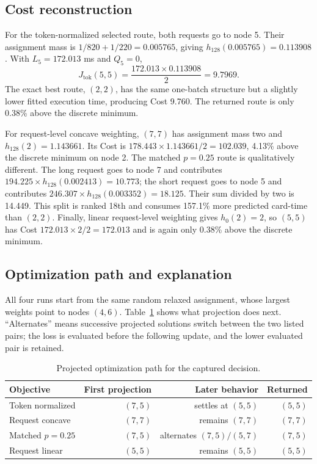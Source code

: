 \documentclass[10pt]{article}
\begin{document}
\subsection{Cost reconstruction}

For the token-normalized selected route, both requests go to node 5. Their
assignment mass is $1/820+1/220=0.005765$, giving
$h_{128}(0.005765)=0.113908$. With $L_5=172.013$ ms and $Q_5=0$,
\begin{equation}
J_{\mathrm{tok}}(5,5)
=\frac{172.013\times0.113908}{2}=9.7969.
\end{equation}
The exact best route, $(2,2)$, has the same one-batch structure but a slightly
lower fitted execution time, producing Cost 9.760. The returned route is only
0.38\% above the discrete minimum.

For request-level concave weighting, $(7,7)$ has assignment mass two and
$h_{128}(2)=1.143661$. Its Cost is
$178.443\times1.143661/2=102.039$, 4.13\% above the discrete minimum on node 2.
The matched $p=0.25$ route is qualitatively different. The long request goes
to node 7 and contributes
$194.225\times h_{128}(0.002413)=10.773$; the short request goes to node 5 and
contributes $246.307\times h_{128}(0.003352)=18.125$. Their sum divided by two
is 14.449. This split is ranked 18th and consumes 157.1\% more predicted
card-time than $(2,2)$. Finally, linear request-level weighting gives
$h_0(2)=2$, so $(5,5)$ has Cost $172.013\times2/2=172.013$ and is again only
0.38\% above the discrete minimum.

\subsection{Optimization path and explanation}

All four runs start from the same random relaxed assignment, whose largest
weights point to nodes $(4,6)$. Table~\ref{tab:decision-optimization-path}
shows what projection does next. ``Alternates'' means successive projected
solutions switch between the two listed pairs; the loss is evaluated before
the following update, and the lower evaluated pair is retained.

\begin{table}[t]
\centering
\small
\caption{Projected optimization path for the captured decision.}
\label{tab:decision-optimization-path}
\begin{tabular}{lrrr}
\toprule
Objective & First projection & Later behavior & Returned \\
\midrule
Token normalized & $(7,5)$ & settles at $(5,5)$ & $(5,5)$ \\
Request concave & $(7,7)$ & remains $(7,7)$ & $(7,7)$ \\
Matched $p=0.25$ & $(7,5)$ & alternates $(7,5)/(5,7)$ & $(7,5)$ \\
Request linear & $(5,5)$ & remains $(5,5)$ & $(5,5)$ \\
\bottomrule
\end{tabular}
\end{table}
\end{document}
